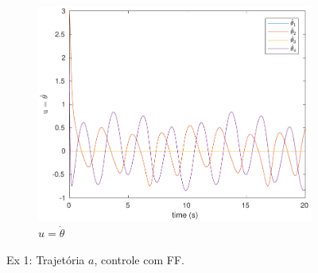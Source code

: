 \documentclass[a4paper,11pt]{article}
\theoremstyle{mytheor}
\begin{document}
\begin{figure}[!ht]
\begin{minipage}{\linewidth}
\begin{subfigure}[b]{0.4\textwidth}
    \end{subfigure}
    \begin{subfigure}[b]{0.4\textwidth}
    \includegraphics[width=1\textwidth]{figs/ex1_a_1_dq.pdf}
    \caption{$u = \dot{\theta}$}
    \label{fig:ex1_a_1_dq}
    \end{subfigure}
  \end{minipage}
\caption{Ex 1: Trajetória $a$, controle com FF.}
\label{fig:ex1_a_1}
\end{figure}
\end{document}
